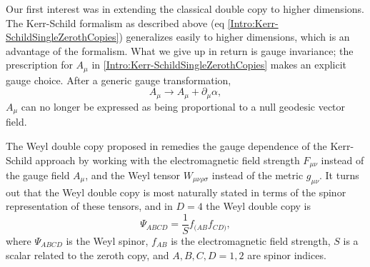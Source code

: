 Our first interest was in extending the classical double copy to higher dimensions. The Kerr-Schild formalism as
described above (eq \eqref{Intro:Kerr-SchildSingleZerothCopies}) generalizes easily to higher dimensions, which is
an advantage of the formalism. What we give up in
return is gauge invariance;
the prescription for $A_{\mu}$ in \ref{Intro:Kerr-SchildSingleZerothCopies} makes an explicit gauge choice. After a
generic gauge transformation,
\begin{equation} \label{} 
    A_{\mu} \to A_{\mu} + \partial_{\mu} \alpha,
\end{equation}
$A_{\mu}$ can no longer be expressed as being proportional to a null geodesic vector field. 

The Weyl double copy proposed in \cite{Luna:2018dpt} remedies the gauge dependence of the Kerr-Schild
approach by working with the electromagnetic field strength $F_{\mu \nu}$ instead of the gauge field
$A_{\mu}$, and the Weyl tensor $W_{\mu \nu \rho \sigma}$ instead of the metric $g_{\mu \nu}$. It turns out that the
Weyl double copy is most naturally stated in terms of the spinor representation of these tensors, and in $D = 4$
the Weyl double copy is
\begin{equation} \label{} 
    \Psi_{ABCD} = \frac{1}{S} f_{(AB} f_{CD)},
\end{equation}
where $\Psi_{ABCD}$ is the Weyl spinor, $f_{AB}$ is the electromagnetic field strength, $S$ is a scalar related to
the zeroth copy, and $A, B, C, D = 1, 2$ are spinor indices.

